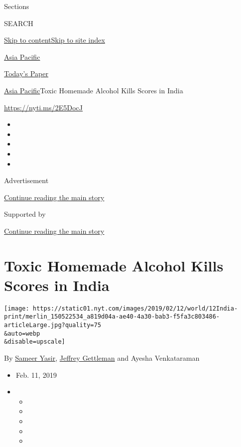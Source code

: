 Sections

SEARCH

\protect\hyperlink{site-content}{Skip to
content}\protect\hyperlink{site-index}{Skip to site index}

\href{https://www.nytimes.com/section/world/asia}{Asia Pacific}

\href{https://myaccount.nytimes.com/auth/login?response_type=cookie\&client_id=vi}{}

\href{https://www.nytimes.com/section/todayspaper}{Today's Paper}

\href{/section/world/asia}{Asia Pacific}\textbar{}Toxic Homemade Alcohol
Kills Scores in India

\url{https://nyti.ms/2E5DocJ}

\begin{itemize}
\item
\item
\item
\item
\item
\end{itemize}

Advertisement

\protect\hyperlink{after-top}{Continue reading the main story}

Supported by

\protect\hyperlink{after-sponsor}{Continue reading the main story}

\hypertarget{toxic-homemade-alcohol-kills-scores-in-india}{%
\section{Toxic Homemade Alcohol Kills Scores in
India}\label{toxic-homemade-alcohol-kills-scores-in-india}}

\texttt{[image: https://static01.nyt.com/images/2019/02/12/world/12India-print/merlin\_150522534\_a819d04a-ae40-4a30-bab3-f5fa3c803486-articleLarge.jpg?quality=75\\\&auto=webp\\\&disable=upscale]}

By \href{https://www.nytimes.com/by/sameer-yasir}{Sameer Yasir},
\href{https://www.nytimes.com/by/jeffrey-gettleman}{Jeffrey Gettleman}
and Ayesha Venkataraman

\begin{itemize}
\item
  Feb. 11, 2019
\item
  \begin{itemize}
  \item
  \item
  \item
  \item
  \item
  \end{itemize}
\end{itemize}

